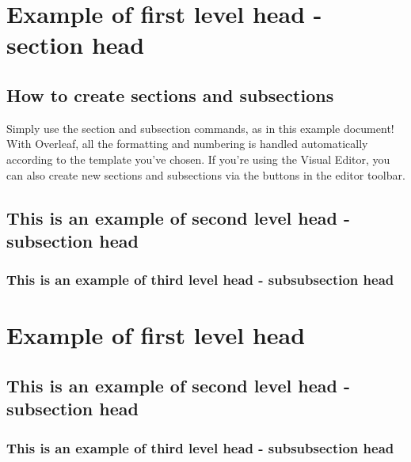 \section{Example of first level head - section head}\label{sec2}

\lipsum[4]

\lipsum[4]


\subsection{How to create sections and subsections}
Simply use the section and subsection commands, as in this example document! With Overleaf, all the formatting and numbering is handled automatically according to the template you've chosen. If you're using the Visual Editor, you can also create new sections and subsections via the buttons in the editor toolbar.

\subsection{This is an example of second level head - subsection head}\label{subsec1}
\lipsum[5]

\subsubsection{This is an example of third level head - subsubsection head}\label{subsubsec1}
\lipsum[6]

\lipsum[7]


\section{Example of first level head}\label{sec3}

\subsection{This is an example of second level head - subsection head}\label{subsec2}

\subsubsection{This is an example of third level head - subsubsection head}\label{subsubsec2}
\lipsum[8]

\lipsum[9]


